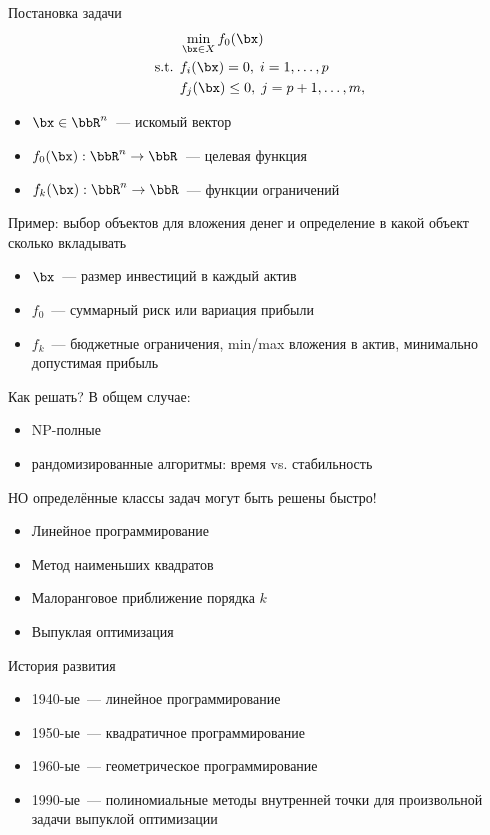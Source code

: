 \documentclass[12pt]{beamer}
\begin{document}
\begin{frame}{Постановка задачи}
\begin{equation*}
\begin{split}
&\min\limits_{\bx \in X} f_0(\bx)\\
\text{s.t. } & f_i(\bx) = 0, \; i = 1,\ldots,p\\
& f_j(\bx) \leq 0, \; j = p+1,\ldots,m,
\end{split}
\end{equation*}
\begin{itemize}
\item $\bx \in \bbR^n$~--- искомый вектор
\item $f_0(\bx): \bbR^n \rightarrow \bbR$~--- целевая функция
\item $f_k(\bx): \bbR^n \rightarrow \bbR$~--- функции ограничений
\end{itemize}
Пример: выбор объектов для вложения денег и определение в какой объект сколько вкладывать
\begin{itemize}
\item $\bx$~--- размер инвестиций в каждый актив
\item $f_0$~--- суммарный риск или вариация прибыли
\item $f_k$~--- бюджетные ограничения, min/max вложения в актив, минимально допустимая прибыль
\end{itemize}

\end{frame}

\begin{frame}{Как решать?}
В общем случае:
\begin{itemize}
\item NP-полные
\item {\small рандомизированные алгоритмы: время vs. стабильность}
\end{itemize}

{\small НО определённые классы задач могут быть решены быстро!}

\begin{itemize}
\item Линейное программирование
\item Метод наименьших квадратов
\item Малоранговое приближение порядка $k$
\item Выпуклая оптимизация
\end{itemize}
\end{frame}

\begin{frame}{История развития}

\begin{itemize}
\item 1940-ые~--- линейное программирование
\item 1950-ые~--- квадратичное программирование
\item 1960-ые~--- геометрическое программирование
\item 1990-ые~--- полиномиальные методы внутренней точки для произвольной задачи выпуклой оптимизации
\end{itemize}
\end{frame}
\end{document}

